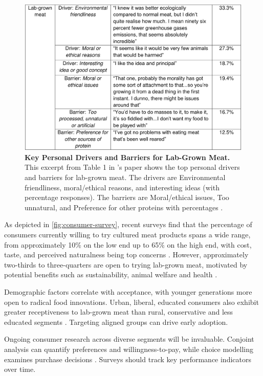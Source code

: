 \documentclass[10pt]{article}
\begin{document}
\begin{sloppypar}
  \begin{figure}[ht]
    \centering
    \includegraphics[width=\textwidth]{figures/excerpt-lab-grown-meat.png}
    \caption[Key Personal Drivers and Barriers for Lab-Grown Meat.]{\textbf{Key Personal Drivers and Barriers for Lab-Grown Meat.} This excerpt from Table 1 in \citeauthor{circus_exploring_2018} ’s paper shows the top personal drivers and barriers for lab-grown meat. The drivers are Environmental friendliness, moral/ethical reasons, and interesting ideas (with percentage responses). The barriers are Moral/ethical issues, Too unnatural, and Preference for other proteins with percentages \citep{circus_exploring_2018}.}
    \label{fig:consumer-survey}
  \end{figure}

  As depicted in \autoref{fig:consumer-survey}, recent surveys find that the percentage of consumers currently willing to try cultured meat products spans a wide range, from approximately 10\% on the low end up to 65\% on the high end, with cost, taste, and perceived naturalness being top concerns \citep{bryant_consumer_2018}. However, approximately two-thirds to three-quarters are open to trying lab-grown meat, motivated by potential benefits such as sustainability, animal welfare and health \citep{wilks_attitudes_2017}.

  Demographic factors correlate with acceptance, with younger generations more open to radical food innovations. Urban, liberal, educated consumers also exhibit greater receptiveness to lab-grown meat than rural, conservative and less educated segments \citep{circus_exploring_2018}. Targeting aligned groups can drive early adoption.

  Ongoing consumer research across diverse segments will be invaluable. Conjoint analysis can quantify preferences and willingness-to-pay, while choice modelling examines purchase decisions \citep{wilks_attitudes_2017}. Surveys should track key performance indicators over time.


\end{sloppypar}
\end{document}
